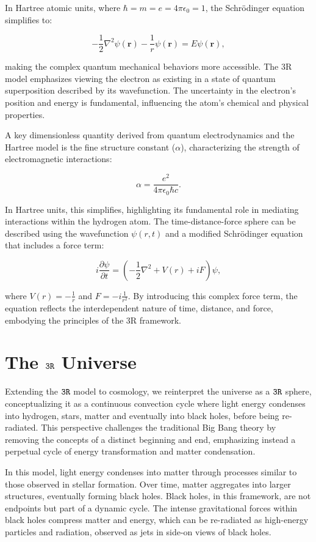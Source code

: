 \documentclass[12pt]{article}
\begin{document}
In Hartree atomic units, where \(\hbar = m = e = 4\pi\epsilon_0 = 1\), the Schrödinger equation simplifies to:

\[
    -\frac{1}{2}\nabla^2 \psi(\mathbf{r}) - \frac{1}{r}\psi(\mathbf{r}) = E\psi(\mathbf{r}),
\]

making the complex quantum mechanical behaviors more accessible. The 3R model emphasizes viewing the electron as existing in a state of quantum superposition described by its wavefunction. The uncertainty in the electron's position and energy is fundamental, influencing the atom's chemical and physical properties.

A key dimensionless quantity derived from quantum electrodynamics and the Hartree model is the fine structure constant (\(\alpha\)), characterizing the strength of electromagnetic interactions:

\[
    \alpha = \frac{e^2}{4\pi \epsilon_0 \hbar c}.
\]

In Hartree units, this simplifies, highlighting its fundamental role in mediating interactions within the hydrogen atom. The time-distance-force sphere can be described using the wavefunction \(\psi(r, t)\) and a modified Schrödinger equation that includes a force term:

\[
    i \frac{\partial \psi}{\partial t} = \left( -\frac{1}{2} \nabla^2 + V(r) + iF \right) \psi,
\]

where \(V(r) = -\frac{1}{r}\) and \(F = -i \frac{1}{r^2}\). By introducing this complex force term, the equation reflects the interdependent nature of time, distance, and force, embodying the principles of the 3R framework.

\section*{The \(\texttt{3R}\) Universe}

Extending the \(\texttt{3R}\) model to cosmology, we reinterpret the universe as a \(\texttt{3R}\) sphere, conceptualizing it as a continuous convection cycle where light energy condenses into hydrogen, stars, matter and eventually into black holes, before being re-radiated. This perspective challenges the traditional Big Bang theory by removing the concepts of a distinct beginning and end, emphasizing instead a perpetual cycle of energy transformation and matter condensation.

In this model, light energy condenses into matter through processes similar to those observed in stellar formation. Over time, matter aggregates into larger structures, eventually forming black holes. Black holes, in this framework, are not endpoints but part of a dynamic cycle. The intense gravitational forces within black holes compress matter and energy, which can be re-radiated as high-energy particles and radiation, observed as jets in side-on views of black holes.
\end{document}
